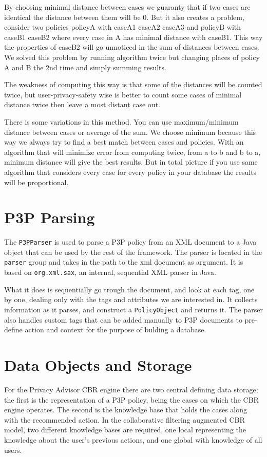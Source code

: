 By choosing minimal distance between cases we guaranty that if two cases are identical the distance between them will be 0. But it also creates a problem, consider two policies policyA with {caseA1 caseA2 caseA3} and policyB with {caseB1 caseB2} where every case in A has minimal distance with caseB1. This way the properties of caseB2 will go unnoticed in the sum of distances between cases. We solved this problem by running algorithm twice but changing places of policy A and B the 2nd time and simply summing results.

The weakness of computing this way is that some of the distances will be counted twice, but user-privacy-safety wise is better to count some cases of minimal distance twice then leave a most distant case out.

There is some variations in this method. You can use maximum/minimum distance between cases or average of the sum. We choose minimum because this way we always try to find a best match between cases and policies. With an algorithm that will minimize error from computing twice, from a to b and b to a, minimum distance will give the best results. But in total picture if you use same algorithm that considers every case for every policy in your database the results will be proportional.

\section{P3P Parsing}\label{parseImpl}
The \texttt{P3PParser} is used to parse a P3P policy from an XML document to a Java object that can be used by the rest of the framework. The parser is located in the \texttt{parser} group and takes in the path to the xml document as argument. It is based on \texttt{org.xml.sax}, an internal, sequential XML parser in Java.

What it does is sequentially go trough the document, and look at each tag, one by one, dealing only with the tags and attributes we are interested in. It collects information as it parses, and construct a \texttt{PolicyObject} and returns it. The parser also handles custom tags that can be added manually to P3P documents to pre-define action and context for the purpose of bulding a database.

\section{Data Objects and Storage}

For the Privacy Advisor CBR engine there are two central defining data storage; the first is the representation of a P3P policy, being the cases on which the CBR engine operates. The second is the knowledge base that holds the cases along with the recommended action. In the collaborative filtering augmented CBR model, two different knowledge bases are required, one local representing the knowledge about the user's previous actions, and one global with knowledge of all users.

